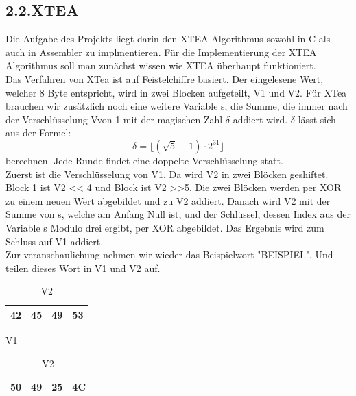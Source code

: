 \documentclass[course=asp]{aspdoc}
\begin{document}
\subsection*{2.2.XTEA}
Die Aufgabe des Projekts liegt darin den XTEA Algorithmus sowohl in C als auch in Assembler zu implmentieren. Für die Implementierung der XTEA Algorithmus soll man zunächst wissen wie XTEA überhaupt funktioniert. \\
Das Verfahren von XTea ist auf Feistelchiffre basiert. Der eingelesene Wert, welcher 8 Byte entspricht, wird in zwei Blocken aufgeteilt, V1 und V2. Für XTea brauchen wir zusätzlich noch eine weitere Variable s, die Summe, die immer nach der Verschlüsselung Vvon 1 mit der magischen Zahl ${\delta}$ addiert wird. ${\delta}$ lässt sich aus der Formel:
\begin{equation}
     \delta  =   \lfloor ( \surd 5 -1)  \cdot  2^{31} \rfloor
\end{equation}
berechnen. Jede Runde findet eine doppelte Verschlüsselung statt. \\
Zuerst ist die Verschlüsselung von V1. Da wird V2 in zwei Blöcken geshiftet. Block 1 ist V2 << 4 und Block ist V2 >>5. Die zwei Blöcken werden per XOR zu einem neuen Wert abgebildet und zu V2 addiert. Danach wird V2 mit der Summe von s, welche am Anfang Null ist, und der Schlüssel, dessen Index aus der Variable s Modulo drei ergibt, per XOR abgebildet. Das Ergebnis wird zum Schluss auf V1 addiert. \\
Zur veranschaulichung nehmen wir wieder das Beispielwort "BEISPIEL". Und teilen dieses Wort in V1 und V2 auf. 
\begin{table}[H]
    
    \begin{minipage}{.5\linewidth}
      
      \centering
        \begin{tabular}{|l|l|l|l|}
		\hline
            42 & 45 & 49 & 53   \\
		\hline
        \end{tabular}

	\caption{V1}
    \end{minipage}%
    \begin{minipage}{.5\linewidth}
    
 \centering
        
        \begin{tabular}{|l|l|l|l|}
           \hline
		 50 & 49 & 25 & 4C   \\
		\hline
        \end{tabular}
\caption{V2} 
    \end{minipage}
\end{table}
 
\end{document}
